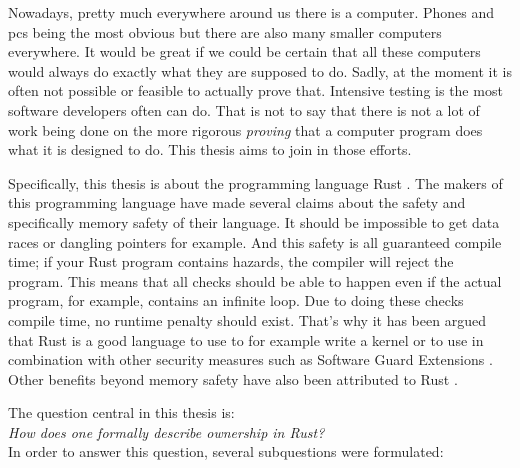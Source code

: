 Nowadays, pretty much everywhere around us there is a computer. Phones and pcs being the most obvious but there are also many smaller computers everywhere. It would be great if we could be certain that all these computers would always do exactly what they are supposed to do. Sadly, at the moment it is often not possible or feasible to actually prove that. Intensive testing is the most software developers often can do. That is not to say that there is not a lot of work being done on the more rigorous \emph{proving} that a computer program does what it is designed to do. This thesis aims to join in those efforts. 

Specifically, this thesis is about the programming language Rust \citep{matsakis2014rust}. The makers of this programming language have made several claims about the safety and specifically memory safety of their language. It should be impossible to get data races or dangling pointers for example. And this safety is all guaranteed compile time; if your Rust program contains hazards, the compiler will reject the program. This means that all checks should be able to happen even if the actual program, for example, contains an infinite loop. Due to doing these checks compile time, no runtime penalty should exist. That's why it has been argued that Rust is a good language to use to for example write a kernel \citep{levy2017kernel} or to use in combination with other security measures such as Software Guard Extensions \citep{ding2017sgx}. Other benefits beyond memory safety have also been attributed to Rust \citep{balasubramanian2017system}.


The question central in this thesis is: \\
\emph{How does one formally describe ownership in Rust?}\\

In order to answer this question, several subquestions were formulated: 

